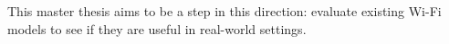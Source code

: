 This master thesis aims to be a step in this direction: evaluate existing Wi-Fi models to see if they are useful in real-world settings.














